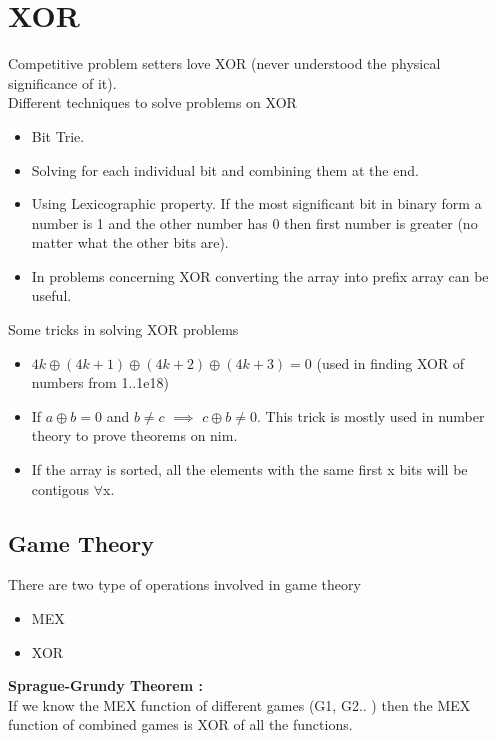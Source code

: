 \documentclass[../Notes.tex]{subfiles}
\begin{document}
\chapter{XOR}
Competitive problem setters love XOR (never understood the physical significance of it).\\

Different techniques to solve problems on XOR
\begin{itemize}
	\item Bit Trie.
	\item Solving for each individual bit and combining them at the end.
	\item Using Lexicographic property. If the most significant bit in binary form a number is 1 and the other number has 0 then first number is greater (no matter what the other bits are).
	\item In problems concerning XOR converting the array into prefix array can be useful.
\end{itemize}

Some tricks in solving XOR problems
\begin{itemize}
	\item $4k\oplus(4k+1)\oplus(4k+2)\oplus(4k+3)=0$ (used in finding XOR of numbers from 1..1e18)
	\item If $a\oplus b=0$ and $b\neq c$ $\implies$ $c\oplus b\neq0$. This trick is mostly used in number theory to prove theorems on nim.
	\item If the array is sorted, all the elements with the same first x bits will be contigous $\forall$x.
\end{itemize}

\pagebreak

\section{Game Theory}
There are two type of operations involved in game theory
\begin{itemize}
	\item MEX
	\item XOR
\end{itemize}

\textbf{Sprague-Grundy Theorem :} \\

If we know the MEX function of different games (G1, G2.. ) then the MEX function of combined games is XOR of all the functions.
\end{document}
